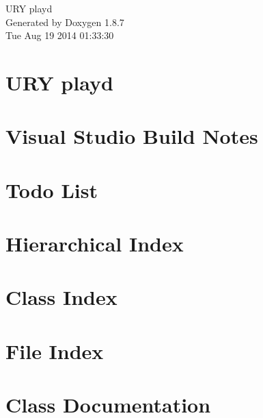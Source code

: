 \documentclass[twoside]{book}
\newcommand{\+}{\discretionary{\mbox{\scriptsize$\hookleftarrow$}}{}{}}
\newcommand{\clearemptydoublepage}{%
  \newpage{\pagestyle{empty}\cleardoublepage}%
}
\begin{document}
\hypersetup{pageanchor=false,
             bookmarks=true,
             bookmarksnumbered=true,
             pdfencoding=unicode
            }
\begin{titlepage}
\vspace*{7cm}
\begin{center}%
{\Large U\+R\+Y playd }\\
\vspace*{1cm}
{\large Generated by Doxygen 1.8.7}\\
\vspace*{0.5cm}
{\small Tue Aug 19 2014 01:33:30}\\
\end{center}
\end{titlepage}
\clearemptydoublepage
\tableofcontents
\clearemptydoublepage
{}
\hypersetup{pageanchor=true}

\chapter{U\+R\+Y playd}
\label{md_README}
\hypertarget{md_README}{}

\chapter{Visual Studio Build Notes}
\label{md_README_8VisualStudio}
\hypertarget{md_README_8VisualStudio}{}

\chapter{Todo List}
\label{todo}
\hypertarget{todo}{}

\chapter{Hierarchical Index}

\chapter{Class Index}

\chapter{File Index}

\chapter{Class Documentation}























\end{document}
